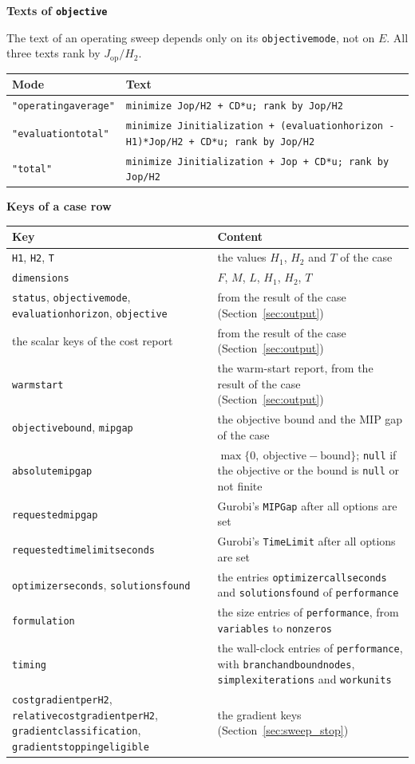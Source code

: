 \documentclass[11pt,a4paper]{article}
\makeatletter
\theoremstyle{plain}
\theoremstyle{definition}
\newcommand{\blockhead}[1]{\par\noindent\textbf{#1}\par\nobreak}
\renewcommand{\_}{\textunderscore\allowbreak{}}
\providecommand{\rejrow}[2]{{\raggedright #1\par} & {\raggedright #2\par} \\}
\providecommand{\tabstart}[2]{\begingroup\small\begin{longtable}{@{}#1@{}}\toprule #2 \\ \midrule \endhead}
\providecommand{\tabend}{\bottomrule\end{longtable}\endgroup}
\makeatother
\begin{document}
\blockhead{Texts of \texttt{objective}}\label{sec:sweep_texts}
The text of an operating sweep depends only on its \texttt{objective\_mode}, not on $E$. All three texts rank by $J_{\mathrm{op}}/H_2$.
\tabstart{p{3.4cm}p{11.6cm}}{Mode & Text}
\rejrow{\texttt{"operating\_average"}}{\texttt{minimize J\_op/H2 + C\_D*u; rank by J\_op/H2}}
\rejrow{\texttt{"evaluation\_total"}}{\texttt{minimize J\_initialization + (evaluation\_horizon - H1)*J\_op/H2 + C\_D*u; rank by J\_op/H2}}
\rejrow{\texttt{"total"}}{\texttt{minimize J\_initialization + J\_op + C\_D*u; rank by J\_op/H2}}
\tabend

\blockhead{Keys of a case row}
\tabstart{p{5.2cm}p{9.8cm}}{Key & Content}
\rejrow{\texttt{H1}, \texttt{H2}, \texttt{T}}{the values $H_1$, $H_2$ and $T$ of the case}
\rejrow{\texttt{dimensions}}{$F$, $M$, $L$, $H_1$, $H_2$, $T$}
\rejrow{\texttt{status}, \texttt{objective\_mode}, \texttt{evaluation\_horizon}, \texttt{objective}}{from the result of the case (Section~\ref{sec:output})}
\rejrow{the scalar keys of the cost report}{from the result of the case (Section~\ref{sec:output})}
\rejrow{\texttt{warm\_start}}{the warm-start report, from the result of the case (Section~\ref{sec:output})}
\rejrow{\texttt{objective\_bound}, \texttt{mip\_gap}}{the objective bound and the MIP gap of the case}
\rejrow{\texttt{absolute\_mip\_gap}}{$\max\{0,\ \text{objective} - \text{bound}\}$; \texttt{null} if the objective or the bound is \texttt{null} or not finite}
\rejrow{\texttt{requested\_mip\_gap}}{Gurobi's \texttt{MIPGap} after all options are set}
\rejrow{\texttt{requested\_time\_limit\_seconds}}{Gurobi's \texttt{TimeLimit} after all options are set}
\rejrow{\texttt{optimizer\_seconds}, \texttt{solutions\_found}}{the entries \texttt{optimizer\_call\_seconds} and \texttt{solutions\_found} of \texttt{performance}}
\rejrow{\texttt{formulation}}{the size entries of \texttt{performance}, from \texttt{variables} to \texttt{nonzeros}}
\rejrow{\texttt{timing}}{the wall-clock entries of \texttt{performance}, with \texttt{branch\_and\_bound\_nodes}, \texttt{simplex\_iterations} and \texttt{work\_units}}
\rejrow{\texttt{cost\_gradient\_per\_H2}, \texttt{relative\_cost\_gradient\_per\_H2}, \texttt{gradient\_classification}, \texttt{gradient\_stopping\_eligible}}{the gradient keys (Section~\ref{sec:sweep_stop})}
\tabend
\end{document}

